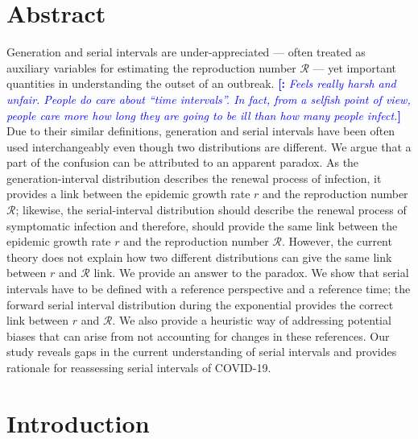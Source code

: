 \documentclass[12pt]{article}
\date{\today}
\newcommand{\comment}{\showcomment}
\newcommand{\showcomment}[3]{\textcolor{#1}{\textbf{[#2: }\textsl{#3}\textbf{]}}}
\newcommand{\mli}[1]{\comment{blue}{}{#1}}
\begin{document}
\begin{flushleft}{
	\Large
	\textbf{}
}
\end{flushleft}

\section*{Abstract}

Generation and serial intervals are under-appreciated --- often treated as auxiliary variables for estimating the reproduction number $\mathcal R$ --- yet important quantities in understanding the outset of an outbreak.
\mli{Feels really harsh and unfair. People do care about ``time intervals''. In fact, from a selfish point of view, people care more how long they are going to be ill than how many people infect.}
Due to their similar definitions, generation and serial intervals have been often used interchangeably even though two distributions are different.
We argue that a part of the confusion can be attributed to an apparent paradox.
As the generation-interval distribution describes the renewal process of infection, it provides a link between the epidemic growth rate $r$ and the reproduction number $\mathcal R$;
likewise, the serial-interval distribution should describe the renewal process of symptomatic infection and therefore, should provide the same link between the epidemic growth rate $r$ and the reproduction number $\mathcal R$.
However, the current theory does not explain how two different distributions can give the same link between $r$ and $\mathcal R$ link.
We provide an answer to the paradox.
We show that serial intervals have to be defined with a reference perspective and a reference time;
the forward serial interval distribution during the exponential provides the correct link between $r$ and $\mathcal R$.
We also provide a heuristic way of addressing potential biases that can arise from not accounting for changes in these references.
Our study reveals gaps in the current understanding of serial intervals and provides rationale for reassessing serial intervals of COVID-19.

\pagebreak

\section{Introduction}
\end{document}
